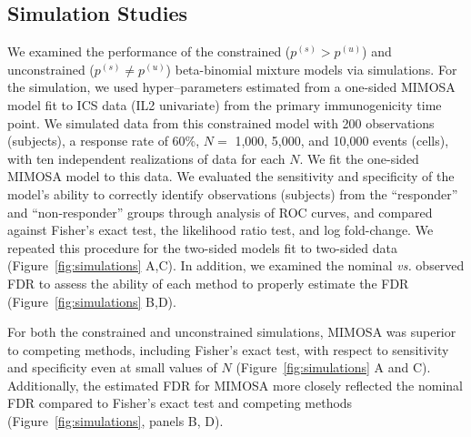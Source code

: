 \documentclass[12pt,oupdraft]{biostatistics}
\begin{document}
\subsection{Simulation Studies}

We examined the performance of the constrained ($p^{(s)}>p^{(u)}$) and unconstrained ($p^{(s)} \ne p^{(u)}$) beta-binomial mixture models via simulations. For the simulation, we used hyper--parameters estimated from a one-sided MIMOSA model fit to ICS data (IL2 univariate) from the primary immunogenicity time point. We simulated data from this constrained model with 200 observations (subjects), a response rate of 60\%, $N=$ 1,000, 5,000, and 10,000 events (cells), with ten independent realizations of data for each $N$. We fit the one-sided MIMOSA model to this data. We evaluated the sensitivity and specificity of the model's ability to correctly identify observations (subjects) from the ``responder'' and ``non-responder'' groups through analysis of ROC curves, and compared against Fisher's exact test, the likelihood ratio test, and log fold-change. We repeated this procedure for the two-sided models fit to two-sided data (Figure~\ref{fig:simulations} A,C). In addition, we examined the nominal \textit{vs.} observed FDR to assess the ability of each method to properly estimate the FDR (Figure~\ref{fig:simulations} B,D).

For both the constrained and unconstrained simulations, MIMOSA was superior to competing methods, including Fisher's exact test, with respect to sensitivity and specificity even at small values of $N$ (Figure~\ref{fig:simulations} A and C). Additionally, the estimated FDR for MIMOSA more closely reflected the nominal FDR compared to Fisher's exact test and competing methods (Figure~\ref{fig:simulations}, panels B, D).
\end{document}
